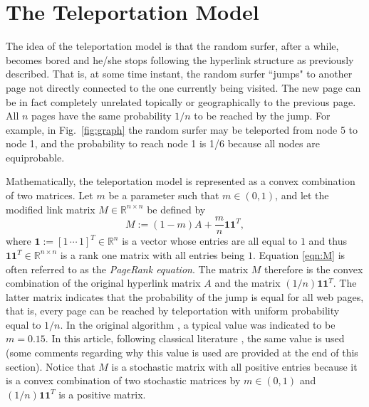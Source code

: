 \documentclass[11pt,draftcls,onecolumn]{IEEEtran}
\newcommand{\field}[1]{{\mathbb{#1}}}
\newcommand{\one}{\mathbf{1}}
\newcommand{\R}{\field{R}}
\begin{document}
\section*{The Teleportation Model}

The idea of the teleportation model is that the random surfer, after a while, becomes bored and 
he/she stops following the hyperlink structure as previously described. That is, at some time instant, 
the random surfer ``jumps" to another page not directly connected to the one currently being visited. 
The new page can be in fact completely unrelated 
topically or geographically to
the previous page. All $n$ pages have the same probability $1/n$ to be reached 
by the jump. For example, in Fig.~\ref{fig:graph} the random surfer may be teleported from 
node 5 to node 1, and the probability to reach node 1 is 1/6 because all nodes are equiprobable.

Mathematically, the teleportation model is represented as a convex combination of two matrices. 
Let $m$ be a parameter such that $m\in(0,1)$, and let the modified link matrix $M\in \R^{n\times n}$ 
be defined by
\begin{equation}
M := (1-m)A + \frac{m}{n} \one \one^T,
\label{eqn:M}
\end{equation}
where $\one :=[1\,\cdots\,1]^T\in\R^n$ is a vector whose entries are all equal to $1$ 
and thus $\one \one^T \in \R^{n\times n}$ is a rank one matrix with all entries being $1$. 
Equation \eqref{eqn:M} is often referred to as the {\it PageRank equation}. The matrix $M$ therefore 
is the convex combination of the original hyperlink matrix $A$ and the matrix 
$(1/n) \one \one^T$. The latter matrix indicates that the probability of the jump is equal for all web pages, 
that is, every page can be reached by teleportation with uniform probability equal to $1/n$.
In the original algorithm \cite{BriPag:98}, 
a typical value was indicated to be $m=0.15$. 
In this article, following classical literature \cite{LanMey:06},
the same value is used
(some comments regarding why this value is used are provided at the end of this section).
Notice that $M$ is a stochastic matrix with all positive entries
because it is a convex combination of 
two stochastic matrices by $m \in (0,1)$ and $(1/n) \one \one^T$ is a positive matrix.
\end{document}
